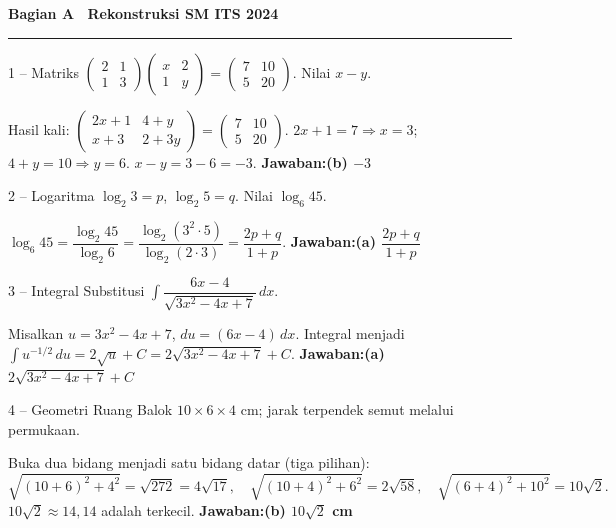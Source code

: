 \documentclass[11pt]{article}
\newcommand{\jawaban}[1]{\textbf{Jawaban:}\enspace\colorbox{gold!30}{\textbf{#1}}}
\begin{document}
\clearpage

{\noindent\large\bfseries Bagian A \textendash\ Rekonstruksi SM ITS 2024\par}\smallskip\hrule\medskip

\begin{soal}{1 -- Matriks}
$\begin{pmatrix}2&1\\1&3\end{pmatrix}\begin{pmatrix}x&2\\1&y\end{pmatrix}=\begin{pmatrix}7&10\\5&20\end{pmatrix}$. Nilai $x-y$.
\end{soal}
\begin{pembox}
Hasil kali: $\begin{pmatrix}2x+1&4+y\\x+3&2+3y\end{pmatrix}=\begin{pmatrix}7&10\\5&20\end{pmatrix}$.
$2x+1=7\Rightarrow x=3$; $4+y=10\Rightarrow y=6$. $x-y=3-6=-3$.
\jawaban{(b) $-3$}
\end{pembox}

\begin{soal}{2 -- Logaritma}
$\log_2 3=p$, $\log_2 5=q$. Nilai $\log_6 45$.
\end{soal}
\begin{pembox}
$\log_6 45=\dfrac{\log_2 45}{\log_2 6}=\dfrac{\log_2(3^2\cdot5)}{\log_2(2\cdot3)}=\dfrac{2p+q}{1+p}$.
\jawaban{(a) $\dfrac{2p+q}{1+p}$}
\end{pembox}

\begin{soal}{3 -- Integral Substitusi}
$\displaystyle\int\dfrac{6x-4}{\sqrt{3x^2-4x+7}}\,dx$.
\end{soal}
\begin{pembox}
Misalkan $u=3x^2-4x+7$, $du=(6x-4)\,dx$. Integral menjadi $\int u^{-1/2}\,du=2\sqrt{u}+C=2\sqrt{3x^2-4x+7}+C$.
\jawaban{(a) $2\sqrt{3x^2-4x+7}+C$}
\end{pembox}

\begin{soal}{4 -- Geometri Ruang}
Balok $10\times6\times4$ cm; jarak terpendek semut melalui permukaan.
\end{soal}
\begin{pembox}
Buka dua bidang menjadi satu bidang datar (tiga pilihan):
\[
\sqrt{(10+6)^2+4^2}=\sqrt{272}=4\sqrt{17},\quad \sqrt{(10+4)^2+6^2}=2\sqrt{58},\quad \sqrt{(6+4)^2+10^2}=10\sqrt{2}.
\]
$10\sqrt2\approx14{,}14$ adalah terkecil.
\jawaban{(b) $10\sqrt{2}$ cm}
\end{pembox}
\end{document}
